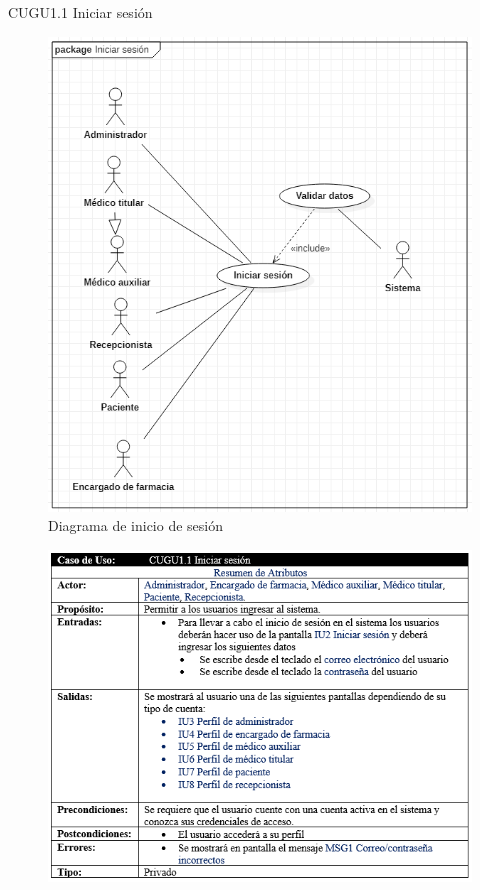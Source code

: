 \documentclass[12pt,letterpaper]{article}
\begin{document}
            \newpage
            CUGU1.1 Iniciar sesión 
            \begin{figure}[H]
                \centering
                \includegraphics [scale=0.3]{casosUso/iniciarSesion}
                \caption{Diagrama de inicio de sesión}
            \end{figure}
            \begin{figure}[H]
                \centering
                \includegraphics [scale=0.9]{casosUso/especificacionInicio}
            \end{figure}
\end{document}
